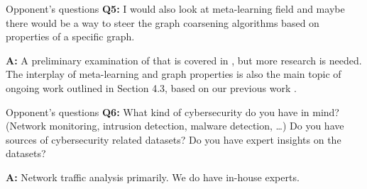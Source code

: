 \documentclass[10pt]{beamer}
\begin{document}
\begin{frame}{Opponent's questions}
	\textbf{Q5:} I would also look at meta-learning field and maybe there would be a way to steer the graph coarsening algorithms based on properties of a specific graph.

	\textbf{A:} A preliminary examination of that is covered in \cite{prochazka_scalable_2022}, but more research is needed. The interplay of meta-learning and graph properties is also the main topic of ongoing work outlined in Section 4.3, based on our previous work \cite{prochazka_which_2023}.
\end{frame}

\begin{frame}{Opponent's questions}
	\textbf{Q6:} What kind of cybersecurity do you have in mind? (Network monitoring, intrusion detection, malware detection, …) Do you have sources of cybersecurity related datasets? Do you have expert insights on the datasets?

	\textbf{A:} Network traffic analysis primarily. We do have in-house experts.
\end{frame}
\end{document}
